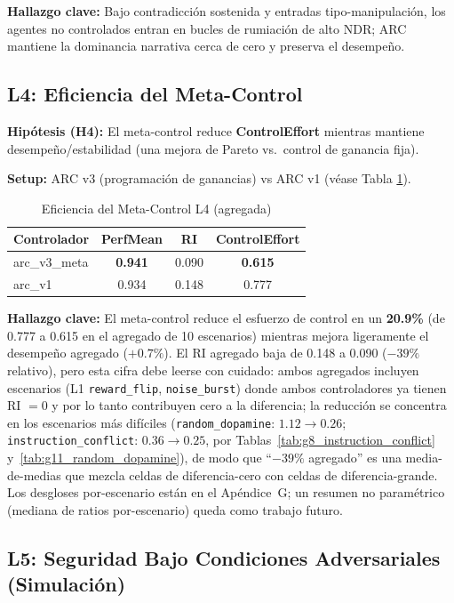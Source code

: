 \documentclass{article}
\begin{document}
\textbf{Hallazgo clave:} Bajo contradicción sostenida y entradas tipo-manipulación, los agentes no controlados entran en bucles de rumiación de alto NDR; ARC mantiene la dominancia narrativa cerca de cero y preserva el desempeño.

\subsection{L4: Eficiencia del Meta-Control}

\textbf{Hipótesis (H4):} El meta-control reduce \textbf{ControlEffort} mientras mantiene desempeño/estabilidad (una mejora de Pareto vs.\ control de ganancia fija).

\textbf{Setup:} ARC v3 (programación de ganancias) vs ARC v1 (véase Tabla \ref{tab:l4_results}).

\begin{table}[htbp]
\centering
\caption{Eficiencia del Meta-Control L4 (agregada)}
\label{tab:l4_results}
\begin{tabular}{@{}lccc@{}}
\toprule

Controlador & PerfMean & RI & ControlEffort \\ \midrule
arc\_v3\_meta & \textbf{0.941} & 0.090 & \textbf{0.615} \\
arc\_v1 & 0.934 & 0.148 & 0.777 \\ \bottomrule
\end{tabular}
\end{table}

\textbf{Hallazgo clave:} El meta-control reduce el esfuerzo de control en un \textbf{20.9\%} (de 0.777 a 0.615 en el agregado de 10 escenarios) mientras mejora ligeramente el desempeño agregado ($+0.7\%$). El RI agregado baja de 0.148 a 0.090 ($-39\%$ relativo), pero esta cifra debe leerse con cuidado: ambos agregados incluyen escenarios (L1 \texttt{reward\_flip}, \texttt{noise\_burst}) donde ambos controladores ya tienen RI $=0$ y por lo tanto contribuyen cero a la diferencia; la reducción se concentra en los escenarios más difíciles (\texttt{random\_dopamine}: $1.12 \rightarrow 0.26$; \texttt{instruction\_conflict}: $0.36 \rightarrow 0.25$, por Tablas~\ref{tab:g8_instruction_conflict} y~\ref{tab:g11_random_dopamine}), de modo que ``$-39\%$ agregado'' es una media-de-medias que mezcla celdas de diferencia-cero con celdas de diferencia-grande. Los desgloses por-escenario están en el Apéndice~G; un resumen no paramétrico (mediana de ratios por-escenario) queda como trabajo futuro.

\subsection{L5: Seguridad Bajo Condiciones Adversariales (Simulación)}
\end{document}

